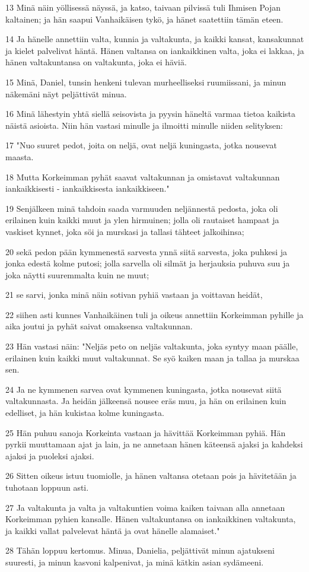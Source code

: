 \par 13 Minä näin yöllisessä näyssä, ja katso, taivaan pilvissä tuli Ihmisen Pojan kaltainen; ja hän saapui Vanhaikäisen tykö, ja hänet saatettiin tämän eteen.
\par 14 Ja hänelle annettiin valta, kunnia ja valtakunta, ja kaikki kansat, kansakunnat ja kielet palvelivat häntä. Hänen valtansa on iankaikkinen valta, joka ei lakkaa, ja hänen valtakuntansa on valtakunta, joka ei häviä.
\par 15 Minä, Daniel, tunsin henkeni tulevan murheelliseksi ruumiissani, ja minun näkemäni näyt peljättivät minua.
\par 16 Minä lähestyin yhtä siellä seisovista ja pyysin häneltä varmaa tietoa kaikista näistä asioista. Niin hän vastasi minulle ja ilmoitti minulle niiden selityksen:
\par 17 "Nuo suuret pedot, joita on neljä, ovat neljä kuningasta, jotka nousevat maasta.
\par 18 Mutta Korkeimman pyhät saavat valtakunnan ja omistavat valtakunnan iankaikkisesti - iankaikkisesta iankaikkiseen."
\par 19 Senjälkeen minä tahdoin saada varmuuden neljännestä pedosta, joka oli erilainen kuin kaikki muut ja ylen hirmuinen; jolla oli rautaiset hampaat ja vaskiset kynnet, joka söi ja murskasi ja tallasi tähteet jalkoihinsa;
\par 20 sekä pedon pään kymmenestä sarvesta ynnä siitä sarvesta, joka puhkesi ja jonka edestä kolme putosi; jolla sarvella oli silmät ja herjauksia puhuva suu ja joka näytti suuremmalta kuin ne muut;
\par 21 se sarvi, jonka minä näin sotivan pyhiä vastaan ja voittavan heidät,
\par 22 siihen asti kunnes Vanhaikäinen tuli ja oikeus annettiin Korkeimman pyhille ja aika joutui ja pyhät saivat omaksensa valtakunnan.
\par 23 Hän vastasi näin: "Neljäs peto on neljäs valtakunta, joka syntyy maan päälle, erilainen kuin kaikki muut valtakunnat. Se syö kaiken maan ja tallaa ja murskaa sen.
\par 24 Ja ne kymmenen sarvea ovat kymmenen kuningasta, jotka nousevat siitä valtakunnasta. Ja heidän jälkeensä nousee eräs muu, ja hän on erilainen kuin edelliset, ja hän kukistaa kolme kuningasta.
\par 25 Hän puhuu sanoja Korkeinta vastaan ja hävittää Korkeimman pyhiä. Hän pyrkii muuttamaan ajat ja lain, ja ne annetaan hänen käteensä ajaksi ja kahdeksi ajaksi ja puoleksi ajaksi.
\par 26 Sitten oikeus istuu tuomiolle, ja hänen valtansa otetaan pois ja hävitetään ja tuhotaan loppuun asti.
\par 27 Ja valtakunta ja valta ja valtakuntien voima kaiken taivaan alla annetaan Korkeimman pyhien kansalle. Hänen valtakuntansa on iankaikkinen valtakunta, ja kaikki vallat palvelevat häntä ja ovat hänelle alamaiset."
\par 28 Tähän loppuu kertomus. Minua, Danielia, peljättivät minun ajatukseni suuresti, ja minun kasvoni kalpenivat, ja minä kätkin asian sydämeeni.

